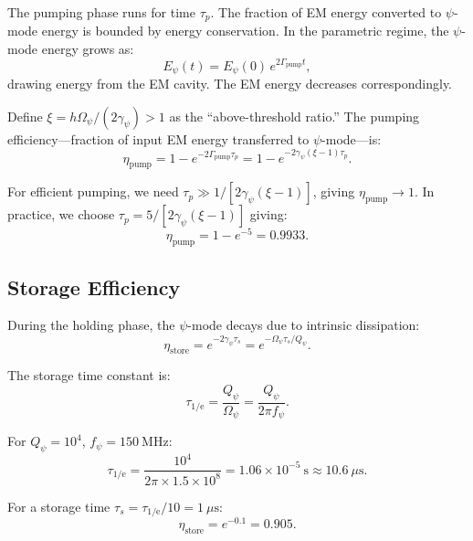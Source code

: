 \documentclass[aps,prd,twocolumn,showpacs,preprintnumbers,superscriptaddress,nofootinbib]{revtex4-2}
\newcommand{\Qpsi}{Q_\psi}
\newcommand{\Opsi}{\Omega_\psi}
\begin{document}
The pumping phase runs for time $\tau_p$.  The fraction of EM energy
converted to $\psi$-mode energy is bounded by energy conservation.
In the parametric regime, the $\psi$-mode energy grows as:
\begin{equation}
E_\psi(t) = E_\psi(0)\,e^{2\Gamma_{\mathrm{pump}} t},
\end{equation}
drawing energy from the EM cavity.  The EM energy decreases correspondingly.

Define $\xi = h\Opsi/(2\gamma_\psi) > 1$ as the ``above-threshold ratio.''
The pumping efficiency---fraction of input EM energy transferred to
$\psi$-mode---is:
\begin{equation}\label{eq:eta-pump}
\eta_{\mathrm{pump}} = 1 - e^{-2\Gamma_{\mathrm{pump}}\tau_p}
  = 1 - e^{-2\gamma_\psi(\xi - 1)\tau_p}.
\end{equation}

For efficient pumping, we need $\tau_p \gg 1/[2\gamma_\psi(\xi-1)]$,
giving $\eta_{\mathrm{pump}} \to 1$.  In practice, we choose
$\tau_p = 5/[2\gamma_\psi(\xi-1)]$ giving:
\begin{equation}
\eta_{\mathrm{pump}} = 1 - e^{-5} = 0.9933.
\end{equation}

\subsection{Storage Efficiency}\label{sec:store-eff}

During the holding phase, the $\psi$-mode decays due to intrinsic
dissipation:
\begin{equation}\label{eq:eta-store}
\eta_{\mathrm{store}} = e^{-2\gamma_\psi\tau_s}
  = e^{-\Opsi\tau_s/\Qpsi}.
\end{equation}

The storage time constant is:
\begin{equation}
\tau_{\mathrm{1/e}} = \frac{\Qpsi}{\Opsi} = \frac{\Qpsi}{2\pi f_\psi}.
\end{equation}

For $\Qpsi = 10^4$, $f_\psi = 150~\mathrm{MHz}$:
\begin{equation}
\tau_{\mathrm{1/e}} = \frac{10^4}{2\pi\times 1.5\times 10^8}
  = 1.06\times 10^{-5}~\mathrm{s} \approx 10.6~\mu\mathrm{s}.
\end{equation}

For a storage time $\tau_s = \tau_{\mathrm{1/e}}/10 = 1~\mu\mathrm{s}$:
\begin{equation}
\eta_{\mathrm{store}} = e^{-0.1} = 0.905.
\end{equation}
\end{document}

